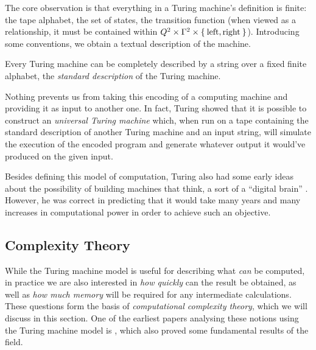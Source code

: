 The core observation is that everything in a Turing machine's definition is finite: the tape alphabet, the set of states, the transition function (when viewed as a relationship, it must be contained within \(Q^2 \times \Gamma^2 \times \Set{ \text{left}, \text{right} }\)). Introducing some conventions, we obtain a textual description of the machine. 

\begin{proposition}
Every Turing machine can be completely described by a string over a fixed finite alphabet, the \emph{standard description} of the Turing machine.
\end{proposition}

Nothing prevents us from taking this encoding of a computing machine and providing it as input to another one. In fact, Turing showed that it is possible to construct an \emph{universal Turing machine} which, when run on a tape containing the standard description of another Turing machine and an input string, will simulate the execution of the encoded program and generate whatever output it would've produced on the given input.




Besides defining this model of computation, Turing also had some early ideas about the possibility of building machines that think, a sort of a ``digital brain'' \cite{Turing1951_IntelligentMachineryLecture, Turing1951_CanDigitalComputersThink}. However, he was correct in predicting that it would take many years and many increases in computational power in order to achieve such an objective.

\subsection{Complexity Theory}

While the Turing machine model is useful for describing what \emph{can} be computed, in practice we are also interested in \emph{how quickly} can the result be obtained, as well as \emph{how much memory} will be required for any intermediate calculations. These questions form the basis of \emph{computational complexity theory}, which we will discuss in this section. One of the earliest papers analysing these notions using the Turing machine model is \cite{Hartmanis1965}, which also proved some fundamental results of the field.

